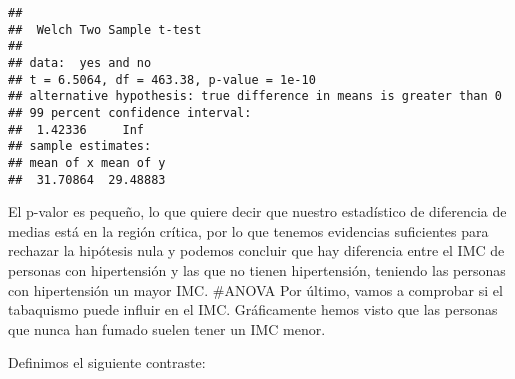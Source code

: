 \documentclass[
]{article}
\newenvironment{Shaded}{\begin{snugshade}}{\end{snugshade}}
\newcommand{\AttributeTok}[1]{\textcolor[rgb]{0.77,0.63,0.00}{#1}}
\newcommand{\CommentTok}[1]{\textcolor[rgb]{0.56,0.35,0.01}{\textit{#1}}}
\newcommand{\ConstantTok}[1]{\textcolor[rgb]{0.00,0.00,0.00}{#1}}
\newcommand{\DecValTok}[1]{\textcolor[rgb]{0.00,0.00,0.81}{#1}}
\newcommand{\FloatTok}[1]{\textcolor[rgb]{0.00,0.00,0.81}{#1}}
\newcommand{\FunctionTok}[1]{\textcolor[rgb]{0.00,0.00,0.00}{#1}}
\newcommand{\NormalTok}[1]{#1}
\newcommand{\OtherTok}[1]{\textcolor[rgb]{0.56,0.35,0.01}{#1}}
\newcommand{\SpecialCharTok}[1]{\textcolor[rgb]{0.00,0.00,0.00}{#1}}
\newcommand{\StringTok}[1]{\textcolor[rgb]{0.31,0.60,0.02}{#1}}
\begin{document}
\begin{Shaded}
\end{Shaded}

\begin{verbatim}
## 
##  Welch Two Sample t-test
## 
## data:  yes and no
## t = 6.5064, df = 463.38, p-value = 1e-10
## alternative hypothesis: true difference in means is greater than 0
## 99 percent confidence interval:
##  1.42336     Inf
## sample estimates:
## mean of x mean of y 
##  31.70864  29.48883
\end{verbatim}

El p-valor es pequeño, lo que quiere decir que nuestro estadístico de
diferencia de medias está en la región crítica, por lo que tenemos
evidencias suficientes para rechazar la hipótesis nula y podemos
concluir que hay diferencia entre el IMC de personas con hipertensión y
las que no tienen hipertensión, teniendo las personas con hipertensión
un mayor IMC. \#ANOVA Por último, vamos a comprobar si el tabaquismo
puede influir en el IMC. Gráficamente hemos visto que las personas que
nunca han fumado suelen tener un IMC menor.

Definimos el siguiente contraste:
\end{document}
